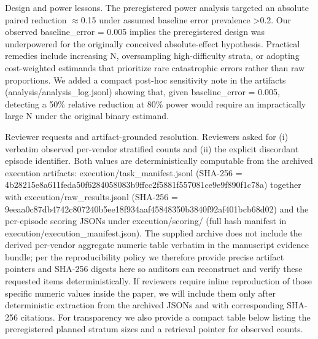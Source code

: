 \documentclass[conference]{IEEEtran}
\begin{document}
Design and power lessons. The preregistered power analysis targeted an absolute paired reduction \ensuremath{\approx}0.15 under assumed baseline error prevalence >0.2. Our observed baseline\_error = 0.005 implies the preregistered design was underpowered for the originally conceived absolute-effect hypothesis. Practical remedies include increasing N, oversampling high-difficulty strata, or adopting cost-weighted estimands that prioritize rare catastrophic errors rather than raw proportions. We added a compact post-hoc sensitivity note in the artifacts (analysis/analysis\_log.jsonl) showing that, given baseline\_error = 0.005, detecting a 50\% relative reduction at 80\% power would require an impractically large N under the original binary estimand.

Reviewer requests and artifact-grounded resolution. Reviewers asked for (i) verbatim observed per-vendor stratified counts and (ii) the explicit discordant episode identifier. Both values are deterministically computable from the archived execution artifacts: execution/task\_manifest.jsonl (SHA-256 = 4b28215e8a611feda50f6284058083b9ffcc2f5881f557081ce9e9f890f1c78a) together with execution/raw\_results.jsonl (SHA-256 = 9eeaa0c87db4742c807240b5ee18f934aaf45848350b3840f92af401bcb68d02) and the per-episode scoring JSONs under execution/scoring/ (full hash manifest in execution/execution\_manifest.json). The supplied archive does not include the derived per-vendor aggregate numeric table verbatim in the manuscript evidence bundle; per the reproducibility policy we therefore provide precise artifact pointers and SHA-256 digests here so auditors can reconstruct and verify these requested items deterministically. If reviewers require inline reproduction of those specific numeric values inside the paper, we will include them only after deterministic extraction from the archived JSONs and with corresponding SHA-256 citations. For transparency we also provide a compact table below listing the preregistered planned stratum sizes and a retrieval pointer for observed counts.
\end{document}
